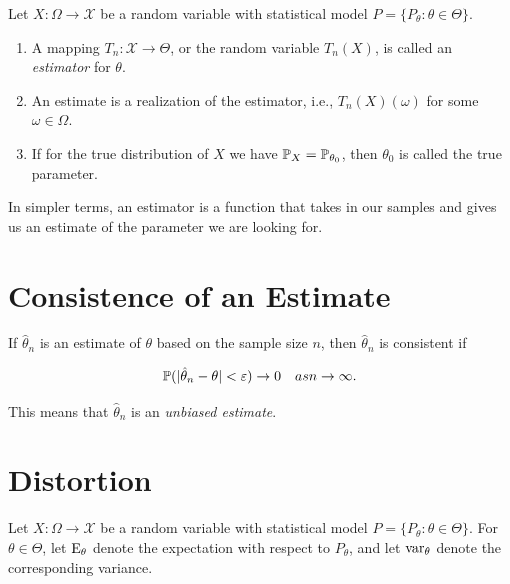 Let \(X : \Omega \to \mathcal{X}\) be a random variable with statistical model \(P = \{ P_{\theta} : \theta \in \Theta \}\).

\begin{enumerate}

    \item A mapping \(T_{n} : \mathcal{X} \to \Theta\), or the random variable \(T_{n}(X)\),
    is called an \emph{estimator} for \(\theta\).

    \item An estimate is a realization of the estimator, i.e.,
    \(T_{n}(X)(\omega)\) for some \(\omega \in \Omega\).

    \item If for the true distribution of \(X\) we have \(\mathbb{P}_{X} = \mathbb{P}_{\theta_{0}}\),
    then \(\theta_{0}\) is called the true parameter.

\end{enumerate}

In simpler terms, an estimator is a function that takes in our samples and gives us an estimate of the parameter we are looking for.

\section{Consistence of an Estimate}

If \(\hat{\theta}_n\) is an estimate of \(\theta\) based on the sample size \(n\), then \(\hat{\theta}_n\) is 
consistent if 

\[
    \mathbb{P}(| \hat{\theta}_n - \theta| < \varepsilon) \to 0 \quad as n \to \infty.
\]

This means that \(\hat{\theta}_n\) is an \emph{unbiased estimate}.

\section{Distortion}

Let \(X : \Omega \to \mathcal{X}\) be a random variable with statistical model  
\(P = \{ P_{\theta} : \theta \in \Theta \}\). For \(\theta \in \Theta\), let \( \mathrm{E}_{\theta} \) denote the
expectation with respect to \(P_{\theta}\), and let \(\mathrm{var}_{\theta}\) denote the corresponding variance.

